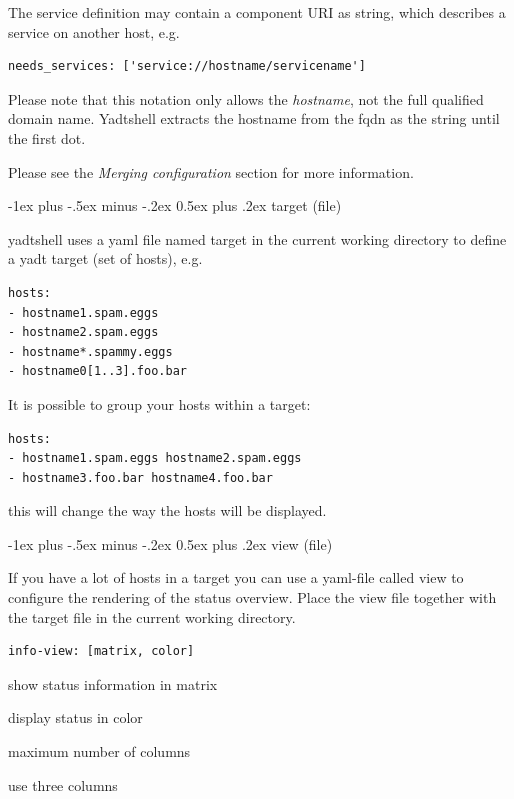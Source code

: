 \documentclass[10pt,landscape]{article}
\makeatletter
\renewcommand{\section}{\@startsection{section}{1}{0mm}%
                                {-1ex plus -.5ex minus -.2ex}%
                                {0.5ex plus .2ex}%
                                {\normalfont\large\bfseries}}
\makeatother
\begin{document}
\begin{multicols}{3}
The service definition may contain a component URI as string,
which describes a service on another host, e.g.

\begin{lstlisting}
needs_services: ['service://hostname/servicename']
\end{lstlisting}

Please note that this notation only allows the \emph{hostname},
not the full qualified domain name. Yadtshell extracts the hostname from
the fqdn as the string until the first dot.

Please see the \emph{Merging configuration} section for more information.



\section{target (file)}

yadtshell uses a yaml file named target in the current working directory to define a yadt target (set of hosts), e.g.

\begin{lstlisting}
hosts:
- hostname1.spam.eggs
- hostname2.spam.eggs
- hostname*.spammy.eggs
- hostname0[1..3].foo.bar
\end{lstlisting}

It is possible to group your hosts within a target:

\begin{lstlisting}
hosts:
- hostname1.spam.eggs hostname2.spam.eggs
- hostname3.foo.bar hostname4.foo.bar
\end{lstlisting}

this will change the way the hosts will be displayed.



\section{view (file)}

If you have a lot of hosts in a target you can use a yaml-file
called view to configure the rendering of the status overview.
Place the view file together with the target file in the current
working directory.

\begin{lstlisting}
info-view: [matrix, color]
\end{lstlisting}

\begin{description}[font=\bfseries,leftmargin=1.5cm,style=sameline]
    \item [matrix]  show status information in matrix
    \item[color]    display status in color
    \item[maxcols]  maximum number of columns
    \item[3cols]    use three columns
\end{description}




\end{multicols}
\end{document}
